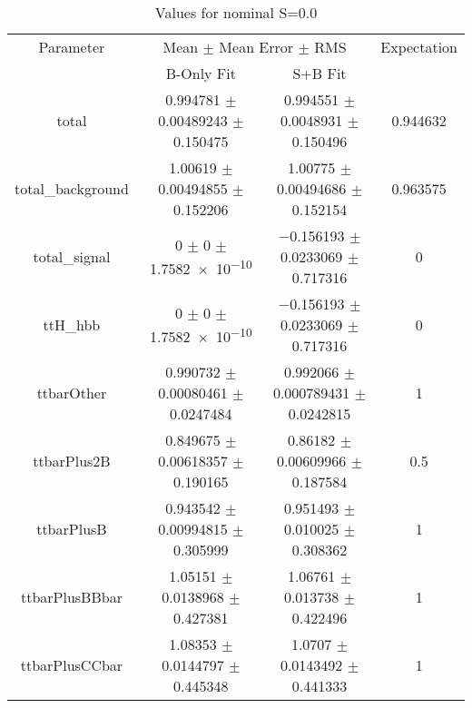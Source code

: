 \begin{table}
\centering
\caption{Values for nominal S=0.0}
\begin{tabular}{cccc}
\toprule
Parameter & \multicolumn{2}{c}{Mean $\pm$ Mean Error $\pm$ RMS} & Expectation\\
 & B-Only Fit & S+B Fit & \\
\midrule
total & \num{0.994781} $\pm$ \num{0.00489243} $\pm$ \num{0.150475} & \num{0.994551} $\pm$ \num{0.0048931} $\pm$ \num{0.150496} & \num{0.944632}\\
total\_background & \num{1.00619} $\pm$ \num{0.00494855} $\pm$ \num{0.152206} & \num{1.00775} $\pm$ \num{0.00494686} $\pm$ \num{0.152154} & \num{0.963575}\\
total\_signal & \num{0} $\pm$ \num{0} $\pm$ \num{1.7582e-10} & \num{-0.156193} $\pm$ \num{0.0233069} $\pm$ \num{0.717316} & \num{0}\\
ttH\_hbb & \num{0} $\pm$ \num{0} $\pm$ \num{1.7582e-10} & \num{-0.156193} $\pm$ \num{0.0233069} $\pm$ \num{0.717316} & \num{0}\\
ttbarOther & \num{0.990732} $\pm$ \num{0.00080461} $\pm$ \num{0.0247484} & \num{0.992066} $\pm$ \num{0.000789431} $\pm$ \num{0.0242815} & \num{1}\\
ttbarPlus2B & \num{0.849675} $\pm$ \num{0.00618357} $\pm$ \num{0.190165} & \num{0.86182} $\pm$ \num{0.00609966} $\pm$ \num{0.187584} & \num{0.5}\\
ttbarPlusB & \num{0.943542} $\pm$ \num{0.00994815} $\pm$ \num{0.305999} & \num{0.951493} $\pm$ \num{0.010025} $\pm$ \num{0.308362} & \num{1}\\
ttbarPlusBBbar & \num{1.05151} $\pm$ \num{0.0138968} $\pm$ \num{0.427381} & \num{1.06761} $\pm$ \num{0.013738} $\pm$ \num{0.422496} & \num{1}\\
ttbarPlusCCbar & \num{1.08353} $\pm$ \num{0.0144797} $\pm$ \num{0.445348} & \num{1.0707} $\pm$ \num{0.0143492} $\pm$ \num{0.441333} & \num{1}\\
\bottomrule
\end{tabular}
\end{table}